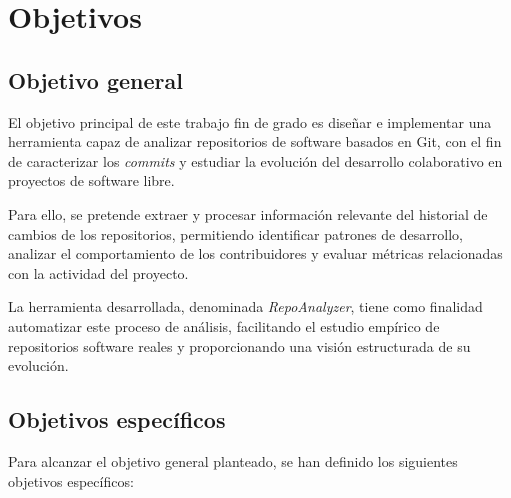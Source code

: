\documentclass[a4paper, 12pt]{book}
\begin{document}
\cleardoublepage %
\chapter{Objetivos} %
\label{chap:objetivos} %

\section{Objetivo general} %
\label{sec:objetivo-general} %

El objetivo principal de este trabajo fin de grado es diseñar e implementar una herramienta capaz de analizar repositorios de software basados en Git, con el fin de caracterizar los \emph{commits} y estudiar la evolución del desarrollo colaborativo en proyectos de software libre.

Para ello, se pretende extraer y procesar información relevante del historial de cambios de los repositorios, permitiendo identificar patrones de desarrollo, analizar el comportamiento de los contribuidores y evaluar métricas relacionadas con la actividad del proyecto.

La herramienta desarrollada, denominada \emph{RepoAnalyzer}, tiene como finalidad automatizar este proceso de análisis, facilitando el estudio empírico de repositorios software reales y proporcionando una visión estructurada de su evolución.


\section{Objetivos específicos}
\label{sec:objetivos-especificos}

Para alcanzar el objetivo general planteado, se han definido los siguientes objetivos específicos:
\end{document}
